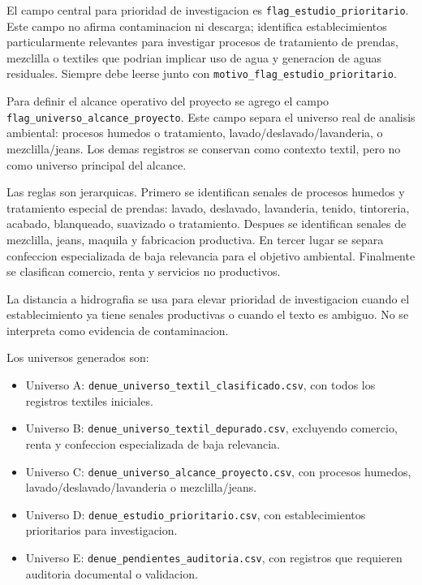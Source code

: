 \documentclass[11pt,letterpaper]{article}
\begin{document}
El campo central para prioridad de investigacion es \texttt{flag\_estudio\_prioritario}. Este campo no afirma contaminacion ni descarga; identifica establecimientos particularmente relevantes para investigar procesos de tratamiento de prendas, mezclilla o textiles que podrian implicar uso de agua y generacion de aguas residuales. Siempre debe leerse junto con \texttt{motivo\_flag\_estudio\_prioritario}.

Para definir el alcance operativo del proyecto se agrego el campo \texttt{flag\_universo\_alcance\_proyecto}. Este campo separa el universo real de analisis ambiental: procesos humedos o tratamiento, lavado/deslavado/lavanderia, o mezclilla/jeans. Los demas registros se conservan como contexto textil, pero no como universo principal del alcance.

Las reglas son jerarquicas. Primero se identifican senales de procesos humedos y tratamiento especial de prendas: lavado, deslavado, lavanderia, tenido, tintoreria, acabado, blanqueado, suavizado o tratamiento. Despues se identifican senales de mezclilla, jeans, maquila y fabricacion productiva. En tercer lugar se separa confeccion especializada de baja relevancia para el objetivo ambiental. Finalmente se clasifican comercio, renta y servicios no productivos.

La distancia a hidrografia se usa para elevar prioridad de investigacion cuando el establecimiento ya tiene senales productivas o cuando el texto es ambiguo. No se interpreta como evidencia de contaminacion.

Los universos generados son:

\begin{itemize}
  \item Universo A: \texttt{denue\_universo\_textil\_clasificado.csv}, con todos los registros textiles iniciales.
  \item Universo B: \texttt{denue\_universo\_textil\_depurado.csv}, excluyendo comercio, renta y confeccion especializada de baja relevancia.
  \item Universo C: \texttt{denue\_universo\_alcance\_proyecto.csv}, con procesos humedos, lavado/deslavado/lavanderia o mezclilla/jeans.
  \item Universo D: \texttt{denue\_estudio\_prioritario.csv}, con establecimientos prioritarios para investigacion.
  \item Universo E: \texttt{denue\_pendientes\_auditoria.csv}, con registros que requieren auditoria documental o validacion.
\end{itemize}
\end{document}
